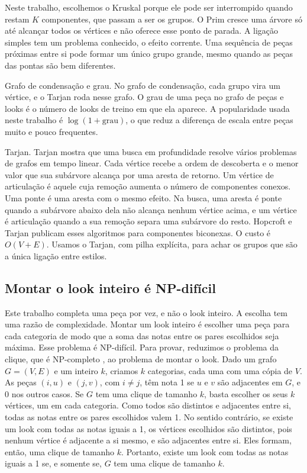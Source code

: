 \documentclass[conference]{IEEEtran}
\begin{document}
Neste trabalho, escolhemos o Kruskal porque ele pode ser interrompido quando restam $K$ componentes, que passam a ser os grupos. O Prim cresce uma árvore só até alcançar todos os vértices e não oferece esse ponto de parada. A ligação simples tem um problema conhecido, o efeito corrente. Uma sequência de peças próximas entre si pode formar um único grupo grande, mesmo quando as peças das pontas são bem diferentes.

Grafo de condensação e grau. No grafo de condensação, cada grupo vira um vértice, e o Tarjan roda nesse grafo. O grau de uma peça no grafo de peças e looks é o número de looks de treino em que ela aparece. A popularidade usada neste trabalho é $\log(1 + \text{grau})$, o que reduz a diferença de escala entre peças muito e pouco frequentes.

Tarjan. Tarjan \cite{tarjan1972} mostra que uma busca em profundidade resolve vários problemas de grafos em tempo linear. Cada vértice recebe a ordem de descoberta e o menor valor que sua subárvore alcança por uma aresta de retorno. Um vértice de articulação é aquele cuja remoção aumenta o número de componentes conexos. Uma ponte é uma aresta com o mesmo efeito. Na busca, uma aresta é ponte quando a subárvore abaixo dela não alcança nenhum vértice acima, e um vértice é articulação quando a sua remoção separa uma subárvore do resto. Hopcroft e Tarjan \cite{hopcroft1973} publicam esses algoritmos para componentes biconexas. O custo é $O(V+E)$. Usamos o Tarjan, com pilha explícita, para achar os grupos que são a única ligação entre estilos.

\subsection{Montar o look inteiro é NP-difícil}

Este trabalho completa uma peça por vez, e não o look inteiro. A escolha tem uma razão de complexidade. Montar um look inteiro é escolher uma peça para cada categoria de modo que a soma das notas entre os pares escolhidos seja máxima. Esse problema é NP-difícil. Para provar, reduzimos o problema da clique, que é NP-completo \cite{karp1972}, ao problema de montar o look. Dado um grafo $G = (V, E)$ e um inteiro $k$, criamos $k$ categorias, cada uma com uma cópia de $V$. As peças $(i, u)$ e $(j, v)$, com $i \neq j$, têm nota 1 se $u$ e $v$ são adjacentes em $G$, e 0 nos outros casos. Se $G$ tem uma clique de tamanho $k$, basta escolher os seus $k$ vértices, um em cada categoria. Como todos são distintos e adjacentes entre si, todas as notas entre os pares escolhidos valem 1. No sentido contrário, se existe um look com todas as notas iguais a 1, os vértices escolhidos são distintos, pois nenhum vértice é adjacente a si mesmo, e são adjacentes entre si. Eles formam, então, uma clique de tamanho $k$. Portanto, existe um look com todas as notas iguais a 1 se, e somente se, $G$ tem uma clique de tamanho $k$.
\end{document}
